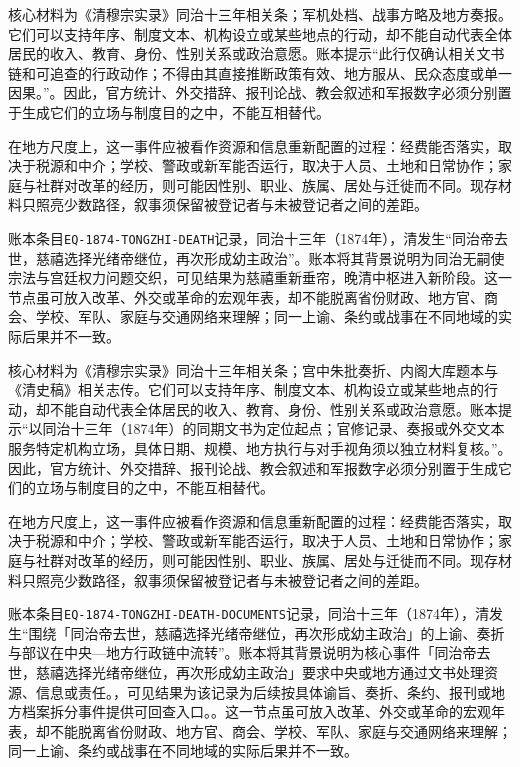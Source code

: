 核心材料为《清穆宗实录》同治十三年相关条；军机处档、战事方略及地方奏报。它们可以支持年序、制度文本、机构设立或某些地点的行动，却不能自动代表全体居民的收入、教育、身份、性别关系或政治意愿。账本提示“此行仅确认相关文书链和可追查的行政动作；不得由其直接推断政策有效、地方服从、民众态度或单一因果。”。因此，官方统计、外交措辞、报刊论战、教会叙述和军报数字必须分别置于生成它们的立场与制度目的之中，不能互相替代。

在地方尺度上，这一事件应被看作资源和信息重新配置的过程：经费能否落实，取决于税源和中介；学校、警政或新军能否运行，取决于人员、土地和日常协作；家庭与社群对改革的经历，则可能因性别、职业、族属、居处与迁徙而不同。现存材料只照亮少数路径，叙事须保留被登记者与未被登记者之间的差距。

账本条目\texttt{EQ-1874-TONGZHI-DEATH}记录，同治十三年（1874年），清发生“同治帝去世，慈禧选择光绪帝继位，再次形成幼主政治”。账本将其背景说明为同治无嗣使宗法与宫廷权力问题交织，可见结果为慈禧重新垂帘，晚清中枢进入新阶段。这一节点虽可放入改革、外交或革命的宏观年表，却不能脱离省份财政、地方官、商会、学校、军队、家庭与交通网络来理解；同一上谕、条约或战事在不同地域的实际后果并不一致。

核心材料为《清穆宗实录》同治十三年相关条；宫中朱批奏折、内阁大库题本与《清史稿》相关志传。它们可以支持年序、制度文本、机构设立或某些地点的行动，却不能自动代表全体居民的收入、教育、身份、性别关系或政治意愿。账本提示“以同治十三年（1874年）的同期文书为定位起点；官修记录、奏报或外交文本服务特定机构立场，具体日期、规模、地方执行与对手视角须以独立材料复核。”。因此，官方统计、外交措辞、报刊论战、教会叙述和军报数字必须分别置于生成它们的立场与制度目的之中，不能互相替代。

在地方尺度上，这一事件应被看作资源和信息重新配置的过程：经费能否落实，取决于税源和中介；学校、警政或新军能否运行，取决于人员、土地和日常协作；家庭与社群对改革的经历，则可能因性别、职业、族属、居处与迁徙而不同。现存材料只照亮少数路径，叙事须保留被登记者与未被登记者之间的差距。

账本条目\texttt{EQ-1874-TONGZHI-DEATH-DOCUMENTS}记录，同治十三年（1874年），清发生“围绕「同治帝去世，慈禧选择光绪帝继位，再次形成幼主政治」的上谕、奏折与部议在中央—地方行政链中流转”。账本将其背景说明为核心事件「同治帝去世，慈禧选择光绪帝继位，再次形成幼主政治」要求中央或地方通过文书处理资源、信息或责任。，可见结果为该记录为后续按具体谕旨、奏折、条约、报刊或地方档案拆分事件提供可回查入口。。这一节点虽可放入改革、外交或革命的宏观年表，却不能脱离省份财政、地方官、商会、学校、军队、家庭与交通网络来理解；同一上谕、条约或战事在不同地域的实际后果并不一致。

